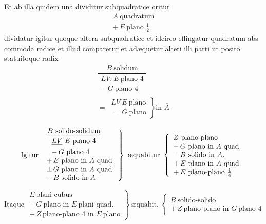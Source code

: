 \documentclass[11pt,a4paper]{article}
\begin{document}
Et ab illa quidem una dividitur subquadratice oritur
\[ \begin{array}{l} A\ \text{quadratum} \\ +\,E\ \text{plano } \frac{1}{2} \end{array} \]
dividatur igitur quoque altera subquadratice et idcirco effingatur quadratum abs commoda radice et illud comparetur et adæquetur alteri illi parti ut posito statuitoque radix
\[ \begin{array}{l} \dfrac{B\ \text{solidum}}{\begin{array}{l} LV.\ E\ \text{plano } 4 \\ -\,G\ \text{plano } 4 \end{array}} \\[2ex] =\,\left.\begin{array}{l} LV\ E\ \text{plano} \\ =\,G\ \text{plano} \end{array}\right\} \text{in } \overline{A} \end{array} \]

\[ \text{Igitur } \left.\begin{array}{l} \dfrac{B\ \text{solido-solidum}}{\begin{array}{l} \struck{LV}\ E\ \text{plano } 4 \\ -\,G\ \text{plano } 4 \end{array}} \\ +\,E\ \text{plano in } A\ \text{quad.} \\ \pm\,G\ \text{plano in } A\ \text{quad.} \\ -\,B\ \text{solido in } A \end{array}\right\}\ \text{æquabitur } \left\{\begin{array}{l} Z\ \text{plano-plano} \\ -\,G\ \text{plano in } A\ \text{quad.} \\ -\,B\ \text{solido in } A. \\ +\,E\ \text{plano in } A\ \text{quad.} \\ +\,E\ \text{plano-plano } \frac{1}{4} \end{array}\right. \]

\[ \text{Itaque } \left.\begin{array}{l} E\ \text{plani cubus} \\ -\,G\ \text{plano in } E\ \text{plani quad.} \\ +\,Z\ \text{plano-plano } 4 \text{ in } E\ \text{plano} \end{array}\right\}\ \text{æquabit. } \left\{\begin{array}{l} B\ \text{solido-solido} \\ +\,Z\ \text{plano-plano in } G\ \text{plano } 4 \end{array}\right. \]
\end{document}
